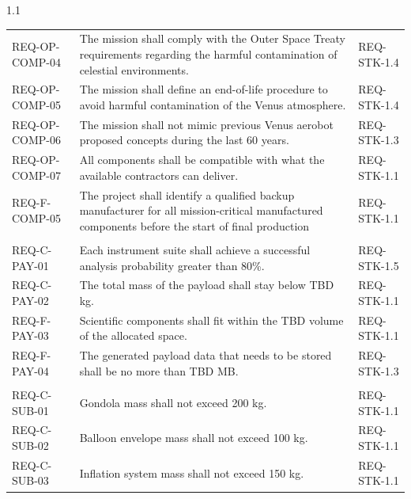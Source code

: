 {{\begin{spacing}{1.1}
\begin{longtable}{@{}
>{\raggedright\arraybackslash}p{}
>{\raggedright\arraybackslash}p{}
>{\raggedright\arraybackslash}p{}
@{}}
REQ-OP-COMP-04 &
The mission shall comply with the Outer Space Treaty requirements regarding the harmful contamination of celestial environments. &
REQ-STK-1.4 \\

REQ-OP-COMP-05 &
The mission shall define an end-of-life procedure to avoid harmful contamination of the Venus atmosphere. &
REQ-STK-1.4 \\

REQ-OP-COMP-06 &
The mission shall not mimic previous Venus aerobot proposed concepts during the last 60 years. &
REQ-STK-1.3 \\

REQ-OP-COMP-07 &
All components shall be compatible with what the available contractors can deliver. &
REQ-STK-1.1 \\

REQ-F-COMP-05 & The project shall identify a qualified backup manufacturer for all mission-critical manufactured components before the start of final production & REQ-STK-1.1 \\

\multicolumn{3}{@{}l}{\textbf{Payload}} \\
\midrule

REQ-C-PAY-01 &
Each instrument suite shall achieve a successful analysis probability greater than 80\%. &
REQ-STK-1.5 \\

REQ-C-PAY-02 &
The total mass of the payload shall stay below TBD kg. &
REQ-STK-1.1 \\

REQ-F-PAY-03 &
Scientific components shall fit within the TBD volume of the allocated space. &
REQ-STK-1.1 \\

REQ-F-PAY-04 &
The generated payload data that needs to be stored shall be no more than TBD MB. &
REQ-STK-1.3 \\

\multicolumn{3}{@{}l}{\textbf{Other Subsystems}} \\
\midrule

REQ-C-SUB-01 &
Gondola mass shall not exceed 200 kg. &
REQ-STK-1.1 \\

REQ-C-SUB-02 &
Balloon envelope mass shall not exceed 100 kg. &
REQ-STK-1.1 \\

REQ-C-SUB-03 &
Inflation system mass shall not exceed 150 kg. &
REQ-STK-1.1 \\


\end{longtable}
\end{spacing}}}
